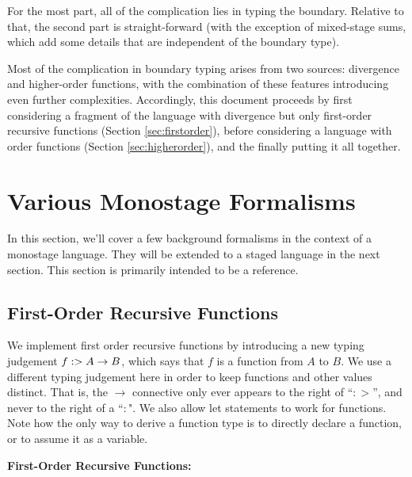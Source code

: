\documentclass[]{article}
\begin{document}
\begin{abstrsyn}
For the most part, all of the complication lies in typing the boundary.
Relative to that, the second part is straight-forward 
(with the exception of mixed-stage sums, which add some details that are independent of the boundary type).

Most of the complication in boundary typing arises from two sources: divergence and higher-order functions,
with the combination of these features introducing even further complexities.
Accordingly, this document proceeds by first considering a fragment of the language with
divergence but only first-order recursive functions (Section \ref{sec:firstorder}),
before considering a language with order functions (Section \ref{sec:higherorder}),
and the finally putting it all together.

\section{Various Monostage Formalisms}

In this section, we'll cover a few background formalisms in the context of a monostage language.
They will be extended to a staged language in the next section.
This section is primarily intended to be a reference.

\subsection{First-Order Recursive Functions}

We implement first order recursive functions by introducing a new typing judgement \mbox{$f :> A \to B$},
which says that $f$ is a function from $A$ to $B$.  
We use a different typing judgement here in order to keep functions and other values distinct.
That is, the $\to$ connective only ever appears to the right of ``$:>$'', and never to the right of a ``$:$".
We also allow let statements to work for functions.
Note how the only way to derive a function type is to directly declare a function, or to assume it as a variable.
\begin{framed}
\noindent\textbf{First-Order Recursive Functions:}
\end{framed}


\end{abstrsyn}
\end{document}
